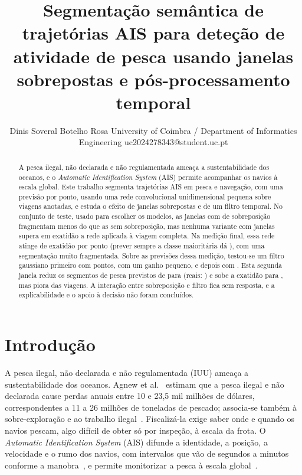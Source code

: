 \documentclass{article}
\title{Segmenta\c{c}\~ao sem\^antica de trajet\'orias AIS para dete\c{c}\~ao de atividade de pesca usando janelas sobrepostas e p\'os-processamento temporal}
\author{
    Dinis Soveral Botelho Rosa
    \affiliations
    University of Coimbra / Department of Informatics Engineering
    \emails
    uc2024278343@student.uc.pt
}
\begin{document}
\maketitle

\begin{abstract}
A pesca ilegal, não declarada e não regulamentada ameaça a sustentabilidade dos oceanos, e o \emph{Automatic Identification System} (AIS) permite acompanhar os navios à escala global. Este trabalho segmenta trajetórias AIS em pesca e navegação, com uma previsão por ponto, usando uma rede convolucional unidimensional pequena sobre \resDadosViagens{} viagens anotadas, e estuda o efeito de janelas sobrepostas e de um filtro temporal. No conjunto de teste, usado para escolher os modelos, as janelas com \resJCSobrep{} de sobreposição fragmentam menos do que as sem sobreposição, mas nenhuma variante com janelas supera em exatidão a rede aplicada à viagem completa. Na medição final, essa rede atinge \resVaValidAcc{} de exatidão por ponto (prever sempre a classe maioritária dá \resVaValidAccMaj{}), com uma segmentação muito fragmentada. Sobre as previsões dessa medição, testou-se um filtro gaussiano primeiro com \resPpViJanela{} pontos, com um ganho pequeno, e depois com \resPpJanela{}. Esta segunda janela reduz os segmentos de pesca previstos de \resPpASegPescaNPred{} para \resPpDSegPescaNPred{} (reais: \resPpASegPescaNRef{}) e sobe a exatidão para \resPpDepoisAcc{}, mas piora \resPpViagPioram{} das \resPpNViagens{} viagens. A interação entre sobreposição e filtro fica sem resposta, e a explicabilidade e o apoio à decisão não foram concluídos.
\end{abstract}

\section{Introdução}
\label{sec:introducao}
A pesca ilegal, não declarada e não regulamentada (IUU) ameaça a sustentabilidade dos oceanos. Agnew et al.~ estimam que a pesca ilegal e não declarada cause perdas anuais entre 10 e 23,5 mil milhões de dólares, correspondentes a 11 a 26 milhões de toneladas de pescado; associa-se também à sobre-exploração e ao trabalho ilegal~\cite{chuaysi2020}. Fiscalizá-la exige saber onde e quando os navios pescam, algo difícil de obter só por inspeção, à escala da frota. O \emph{Automatic Identification System} (AIS) difunde a identidade, a posição, a velocidade e o rumo dos navios, com intervalos que vão de segundos a minutos conforme a manobra~\cite{natale2015}, e permite monitorizar a pesca à escala global~\cite{natale2015,kroodsma2018}.
\end{document}
